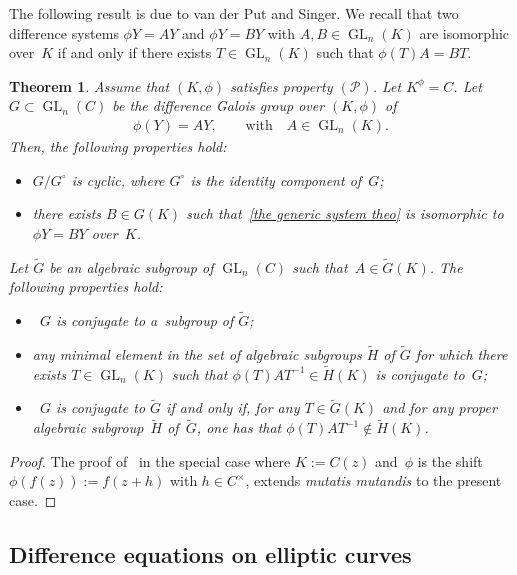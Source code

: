 \documentclass[11pt]{article}
\numberwithin{equation}{section}
\newtheorem{Theorem}{Theorem}[section]
\begin{document}
The following result is due to van der Put and Singer.
We recall that two dif\/ference systems $\phi Y=AY$ and $\phi Y=BY$ with $A,B \in \operatorname{GL}_{n}(K)$ are isomorphic
over~$K$ if and only if there exists $T \in \operatorname{GL}_{n}(K)$ such that $\phi(T) A=BT$.

\begin{Theorem}
\label{si prop P alors}
Assume that $(K,\phi)$ satisfies property $(\mathcal{P})$.
Let $K^{\phi} = C$.
Let $G \subset \operatorname{GL}_{n}(C)$ be the difference Galois group over $(K,\phi)$ of
\begin{gather}
\label{the generic system theo}
\phi(Y) = AY, \qquad \text{with} \quad  A \in \operatorname{GL}_{n}(K).
\end{gather}
Then, the following properties hold:
\begin{itemize}
\itemsep=0pt
\item $G/G^{\circ}$ is cyclic, where $G^{\circ}$ is the identity component of~$G$;
\item there exists $B \in G(K)$ such that~\eqref{the generic system theo} is isomorphic to $\phi Y=BY$ over~$K$.
\end{itemize}
Let $\widetilde{G}$ be an algebraic subgroup of $\operatorname{GL}_{n}(C)$ such that~$A\in \widetilde{G}(K)$.
The following properties hold:
\begin{itemize}
\itemsep=0pt
\item~$G$ is conjugate to a~subgroup of $\widetilde{G}$;
\item any minimal element in the set of algebraic subgroups $\widetilde{H}$ of $\widetilde{G}$ for which there exists
$T\in \operatorname{GL}_{n}(K)$ such that $\phi(T)AT^{-1}\in \widetilde{H}(K)$ is conjugate to~$G$;
\item~$G$ is conjugate to $\widetilde{G}$ if and only if, for any $T\in \widetilde{G}(K)$ and for any proper algebraic
sub\-group~$\widetilde{H}$ of~$\widetilde{G}$, one has that $\phi(T)AT^{-1}\notin \widetilde{H}(K)$.
\end{itemize}
\end{Theorem}

\begin{proof}
The proof of~\cite[Propositions~1.20 and~1.21]{VdPS97} in the special case where $K:=C(z)$ and~$\phi$ is the shift
$\phi(f(z)):=f(z+h)$ with $h \in C^\times$, extends {\it mutatis mutandis} to the present case.
\end{proof}

\subsection{Dif\/ference equations on elliptic curves}
\end{document}
